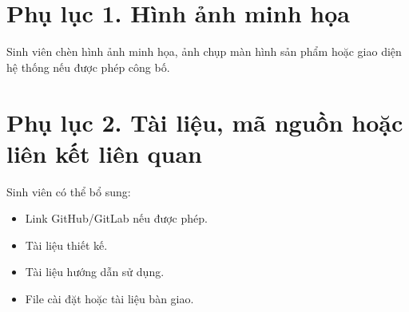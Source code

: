 \appendix
{}

\section*{Phụ lục 1. Hình ảnh minh họa}

Sinh viên chèn hình ảnh minh họa, ảnh chụp màn hình sản phẩm hoặc giao diện hệ thống nếu được phép công bố.

\section*{Phụ lục 2. Tài liệu, mã nguồn hoặc liên kết liên quan}

Sinh viên có thể bổ sung:

\begin{itemize}
    \item Link GitHub/GitLab nếu được phép.
    \item Tài liệu thiết kế.
    \item Tài liệu hướng dẫn sử dụng.
    \item File cài đặt hoặc tài liệu bàn giao.
\end{itemize}
